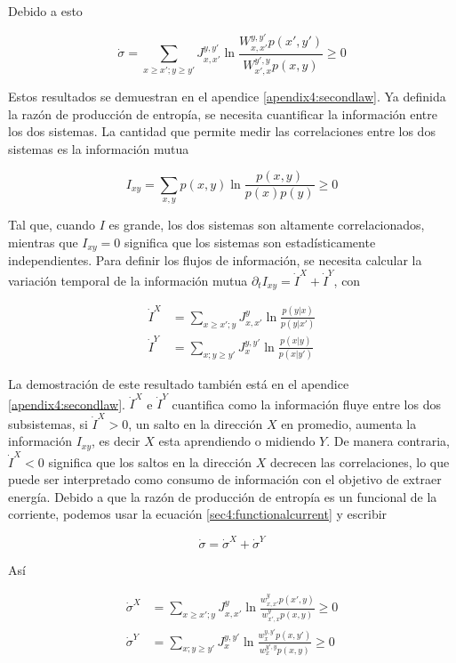 Debido a esto

\begin{equation*}
    \dot{\sigma} = \sum_{x\geq x'; y\geq y'} J_{x,x'}^{y,y'} \ln \frac{ W_{x,x'}^{y,y'}p(x',y')  }{ W_{x',x}^{y',y}p(x,y) } \geq 0
\end{equation*}

Estos resultados se demuestran en el apendice \ref{apendix4:secondlaw}. Ya definida la razón de producción de entropía, se necesita cuantificar la información entre los dos sistemas. La cantidad que permite medir las correlaciones entre los dos sistemas es la información mutua

\begin{equation*}
    I_{xy} = \sum_{x,y} p(x,y) \ln \frac{p(x,y)}{p(x)p(y)} \geq 0 
\end{equation*}

Tal que, cuando $I$ es grande, los dos sistemas son altamente correlacionados, mientras que $I_{xy}=0$ significa que los sistemas son estadísticamente independientes. Para definir los flujos de información, se necesita calcular la variación temporal de la información mutua $\partial_{t} I_{xy} = \dot{I}^{X} + \dot{I}^{Y}$, con

\begin{align*}
    \dot{I}^{X} & = \sum_{x\geq x'; y}J_{x,x'}^{y} \ln \frac{ p(y|x) }{p(y|x')} \\
    \dot{I}^{Y} & = \sum_{x;y\geq y'} J_{x}^{y,y'} \ln \frac{p(x|y)}{ p(x|y') }
\end{align*}

 La demostración de este resultado también está en el apendice \ref{apendix4:secondlaw}. $\dot{I}^{X}$ e $\dot{I}^{Y}$ cuantifica como la información fluye entre los dos subsistemas, si $\dot{I}^{X}>0$, un salto en la dirección $X$ en promedio, aumenta la información $I_{xy}$, es decir $X$ esta aprendiendo o midiendo $Y$. De manera contraria, $\dot{I}^{X}<0$ significa que los saltos en la dirección $X$ decrecen las correlaciones, lo que puede ser interpretado como consumo de información con el objetivo de extraer energía. Debido a que la razón de producción de entropía es un funcional de la corriente, podemos usar la ecuación \ref{sec4:functionalcurrent} y escribir

 \begin{equation*}
    \dot{\sigma} = \dot{\sigma}^{X} + \dot{\sigma}^{Y}
 \end{equation*}

Así

\begin{align*}
    \dot{\sigma}^{X} & = \sum_{x \geq x';y} J_{x,x'}^{y} \ln  \frac{w_{x,x'}^{y} p(x',y) }{w_{x',x}^{y} p(x,y) } \geq 0 \\
    \dot{\sigma}^{Y} & = \sum_{x;y\geq y'}J_{x}^{y,y'} \ln \frac{w_{x}^{y,y'} p(x,y') }{ w_{x}^{y',y} p(x,y) } \geq 0 
\end{align*}

